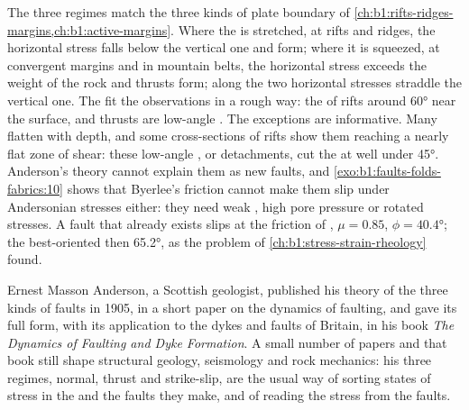 The three regimes match the three kinds of plate boundary of
\cref{ch:b1:rifts-ridges-margins,ch:b1:active-margins}. Where the 
is stretched, at rifts and ridges, the horizontal stress falls below the
vertical one and  form; where it is squeezed, at convergent
margins and in mountain belts, the horizontal stress exceeds the weight of the
rock and thrusts form; along  the two horizontal stresses
straddle the vertical one. The  fit the observations in a rough way: the
 of rifts  around \ang{60} near the surface, and thrusts are
low-angle . The exceptions are informative. Many 
flatten with depth, and some cross-sections of rifts show them reaching a
nearly flat zone of shear: these low-angle , or detachments, cut
the  at well under \ang{45}. Anderson's theory cannot explain
them as new faults, and \cref{exo:b1:faults-folds-fabrics:10} shows that
Byerlee's friction cannot make them slip under Andersonian stresses either:
they need weak , high pore pressure or rotated stresses. A fault
that already exists slips at the friction of ,
$\mu = 0.85$, $\phi = \ang{40.4}$; the best-oriented  then 
\ang{65.2}, as the problem of \cref{ch:b1:stress-strain-rheology} found.

\begin{history}
Ernest Masson Anderson, a Scottish geologist, published his theory of the
three kinds of faults in 1905, in a short paper on the dynamics of faulting,
and gave its full form, with its application to the dykes and faults of
Britain, in his book \emph{The Dynamics of Faulting and Dyke Formation}. A
small number of papers and that book still shape structural geology,
seismology and rock mechanics: his three regimes, normal, thrust and
strike-slip, are the usual way of sorting states of stress in the  and
the faults they make, and of reading the stress from the faults.
\end{history}

